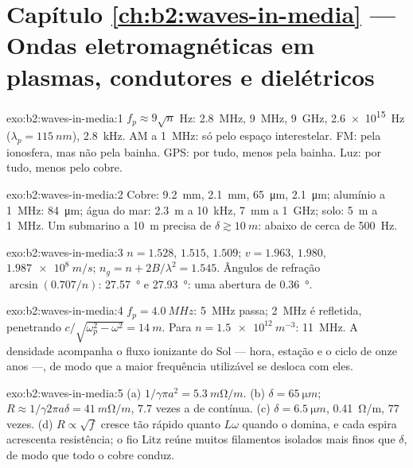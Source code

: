 \section*{Capítulo \ref{ch:b2:waves-in-media} --- Ondas eletromagnéticas em plasmas, condutores e dielétricos}

\begin{solution}{exo:b2:waves-in-media:1}
$f_p \approx 9\sqrt n$ Hz: \qty{2.8}{MHz}, \qty{9}{MHz}, \qty{9}{GHz}, \qty{2.6e15}{Hz}
($\lambda_p = \qty{115}{nm}$), \qty{2.8}{kHz}. AM a \qty{1}{MHz}: só pelo
espaço interestelar. FM: pela ionosfera, mas não pela bainha. GPS:
por tudo, menos pela bainha. Luz: por tudo, menos pelo cobre.
\end{solution}

\begin{solution}{exo:b2:waves-in-media:2}
Cobre: \qty{9.2}{mm}, \qty{2.1}{mm}, \qty{65}{\micro m}, \qty{2.1}{\micro m}; alumínio a
\qty{1}{MHz}: \qty{84}{\micro m}; água do mar: \qty{2.3}{m} a \qty{10}{kHz}, \qty{7}{mm} a
\qty{1}{GHz}; solo: \qty{5}{m} a \qty{1}{MHz}. Um submarino a \qty{10}{m} precisa de $\delta
\gtrsim \qty{10}{m}$: abaixo de cerca de \qty{500}{Hz}.
\end{solution}

\begin{solution}{exo:b2:waves-in-media:3}
$n = 1.528$, $1.515$, $1.509$; $v = 1.963$, $1.980$, $\qty{1.987e8}{m/s}$; $n_g = n +
2B/\lambda^2 = 1.545$. Ângulos de refração $\arcsin(0.707/n)$: \qty{27.57}{\degree} e
\qty{27.93}{\degree}: uma abertura de \qty{0.36}{\degree}.
\end{solution}

\begin{solution}{exo:b2:waves-in-media:4}
$f_p = \qty{4.0}{MHz}$: \qty{5}{MHz} passa; \qty{2}{MHz} é refletida, penetrando
$c/\sqrt{\omega_p^2 - \omega^2} = \qty{14}{m}$. Para $n = \qty{1.5e12}{m^{-3}}$: \qty{11}{MHz}. A
densidade acompanha o fluxo ionizante do Sol --- hora, estação e o
ciclo de onze anos ---, de modo que a maior frequência utilizável se desloca com eles.
\end{solution}

\begin{solution}{exo:b2:waves-in-media:5}
(a) $1/\gamma\pi a^2 = \qty{5.3}{m\ohm/m}$. (b) $\delta = \qty{65}{\micro m}$; $R \approx 1/\gamma2\pi a\delta
= \qty{41}{m\ohm/m}$, $7.7$ vezes a de contínua. (c) $\delta = \qty{6.5}{\micro m}$, \qty{0.41}{\ohm/m},
$77$ vezes. (d) $R \propto \sqrt f$ cresce tão rápido quanto $L\omega$ quando o  domina, e cada espira acrescenta resistência; o fio Litz reúne muitos
filamentos isolados mais finos que $\delta$, de modo que todo o cobre conduz.
\end{solution}

